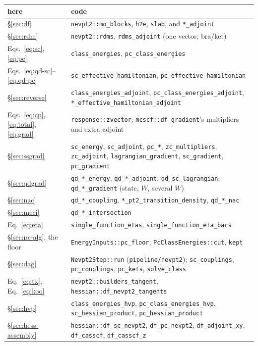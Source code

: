 \documentclass[11pt]{article}
\newcommand{\code}[1]{\texttt{#1}}
\begin{document}
\begin{center}
\small
\begin{tabularx}{\linewidth}{@{}l>{\raggedright\arraybackslash}X@{}}
\toprule
here & code \\
\midrule
\S\ref{sec:df} & \code{nevpt2::mo\_blocks}, \code{h2e}, \code{slab}, and \code{*\_adjoint} \\
\S\ref{sec:rdm} & \code{nevpt2::rdms}, \code{rdms\_adjoint} (one vector; bra/ket) \\
Eqs.~\eqref{eq:sc}, \eqref{eq:pc} & \code{class\_energies}, \code{pc\_class\_energies} \\
Eqs.~\eqref{eq:qd-sc}--\eqref{eq:qd-pc} & \code{sc\_effective\_hamiltonian}, \code{pc\_effective\_hamiltonian} \\
\S\ref{sec:reverse} & \code{class\_energies\_adjoint}, \code{pc\_class\_energies\_adjoint}, \code{*\_effective\_hamiltonian\_adjoint} \\
Eqs.~\eqref{eq:cp}, \eqref{eq:total}, \eqref{eq:grad} & \code{response::zvector}; \code{mcscf::df\_gradient}'s multipliers and extra adjoint \\
\S\ref{sec:ssgrad} & \code{sc\_energy}, \code{sc\_adjoint}, \code{pc\_*}, \code{zc\_multipliers}, \code{zc\_adjoint}, \code{lagrangian\_gradient}, \code{sc\_gradient}, \code{pc\_gradient} \\
\S\ref{sec:qdgrad} & \code{qd\_*\_energy}, \code{qd\_*\_adjoint}, \code{qd\_sc\_lagrangian}, \code{qd\_*\_gradient} (state, $W$, several $W$) \\
\S\ref{sec:nac} & \code{qd\_*\_coupling}, \code{*\_pt2\_transition\_density}, \code{qd\_*\_nac} \\
\S\ref{sec:meci} & \code{qd\_*\_intersection} \\
Eq.~\eqref{eq:eta} & \code{single\_function\_etas}, \code{single\_function\_eta\_bars} \\
\S\ref{sec:pc-alg}, the floor & \code{EnergyInputs::pc\_floor}, \code{PcClassEnergies::cut}, \code{kept} \\
\S\ref{sec:dag} & \code{Nevpt2Step::run} (\code{pipeline/nevpt2}); \code{sc\_couplings}, \code{pc\_couplings}, \code{pc\_kets}, \code{solve\_class} \\
Eq.~\eqref{eq:tx}, Eq.~\eqref{eq:koo} & \code{nevpt2::builders\_tangent}, \code{hessian::df\_nevpt2\_tangents} \\
\S\ref{sec:hvp} & \code{class\_energies\_hvp}, \code{pc\_class\_energies\_hvp}, \code{sc\_hessian\_product}, \code{pc\_hessian\_product} \\
\S\ref{sec:hess-assembly} & \code{hessian::df\_sc\_nevpt2}, \code{df\_pc\_nevpt2}, \code{df\_adjoint\_xy}, \code{df\_casscf}, \code{df\_casscf\_z} \\

\end{tabularx}
\end{center}
\end{document}
